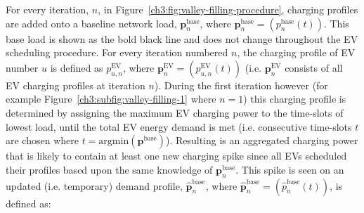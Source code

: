 


For every iteration, $n$, in Figure~\ref{ch3:fig:valley-filling-procedure}, charging profiles are added onto a baseline network load, $\textbf{p}^\text{base}_{n}$, where $\textbf{p}^\text{base}_{n} = (p^\text{base}_{n}(t))$.
This base load is shown as the bold black line and does not change throughout the EV scheduling procedure.
For every iteration numbered $n$, the charging profile of EV number $u$ is defined as $p^\text{EV}_{u,n}$, where $\textbf{p}^\text{EV}_n = (p^\text{EV}_{u,n}(t))$ (i.e. $\textbf{p}^\text{EV}_n$ consists of all EV charging profiles at iteration $n$).
During the first iteration however (for example Figure~\ref{ch3:subfig:valley-filling-1} where $n=1$) this charging profile is determined by assigning the maximum EV charging power to the time-slots of lowest load, until the total EV energy demand is met (i.e. consecutive time-slots $t$ are chosen where $t = \text{argmin}(\textbf{p}^\text{base})$).
Resulting is an aggregated charging power that is likely to contain at least one new charging spike since all EVs scheduled their profiles based upon the same knowledge of $\textbf{p}^\text{base}_{n}$.
This spike is seen on an updated (i.e. temporary) demand profile, $\hat{\textbf{p}}^\text{base}_{n}$, where $\hat{\textbf{p}}^\text{base}_{n} = (\hat{p}^\text{base}_{n}(t))$, is defined as:





